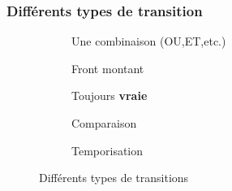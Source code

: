 \subsubsection{Différents types de transition}
\begin{figure}
\centering
    \begin{subfigure}[b]{.4\textwidth}
      \centering
        \vspace{-30pt}
      \caption{Une combinaison (OU,ET,etc.)}
      \label{fig:transitionCombi}
    \end{subfigure}
    \begin{subfigure}[b]{.4\textwidth}
      \centering
        \vspace{-30pt}
      \caption{Front montant}
      \label{fig:transitionFrontMontant}
    \end{subfigure}
\vspace*{10pt}

    \begin{subfigure}[b]{.3\textwidth}
      \centering
        \vspace{-30pt}
      \caption{Toujours \textbf{vraie}}
      \label{fig:transitionVraie}
    \end{subfigure}
    \begin{subfigure}[b]{.3\textwidth}
      \centering
        \vspace{-30pt}
      \caption{Comparaison}
      \label{fig:transitionComparaison}
    \end{subfigure}
    \begin{subfigure}[b]{.3\textwidth}
      \centering
        \vspace{-30pt}
      \caption{Temporisation}
      \label{fig:transitionFrontMontant}
    \end{subfigure}
  \caption{Différents types de transitions}
  \label{fig:TypesTransition}
\end{figure}

